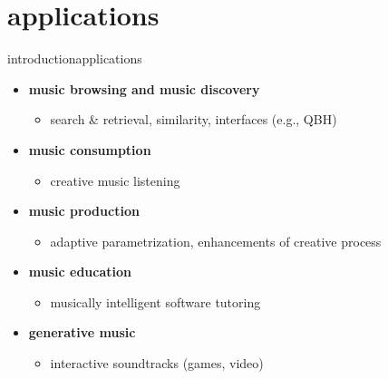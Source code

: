     \section[apps]{applications}
        \begin{frame}{introduction}{applications}
            \begin{itemize}
                \item	\textbf{music browsing and music discovery} 
                    \begin{itemize}
                        \item   search \& retrieval, similarity, interfaces (e.g., QBH)
                    \end{itemize}
                \smallskip
                \item<2->	\textbf{music consumption} 
                    \begin{itemize}
                        \item   creative music listening
                    \end{itemize}
                \smallskip
                \item<3->	 \textbf{music production}
                    \begin{itemize}
                        \item   adaptive parametrization, enhancements of creative process
                    \end{itemize}
                \smallskip
                \item<4->	\textbf{music education}
                    \begin{itemize}
                        \item   musically intelligent software tutoring
                    \end{itemize}
                \smallskip
                \item<5->	\textbf{generative music}
                    \begin{itemize}
                        \item   interactive soundtracks (games, video)
                    \end{itemize}
            \end{itemize}
        \end{frame}
